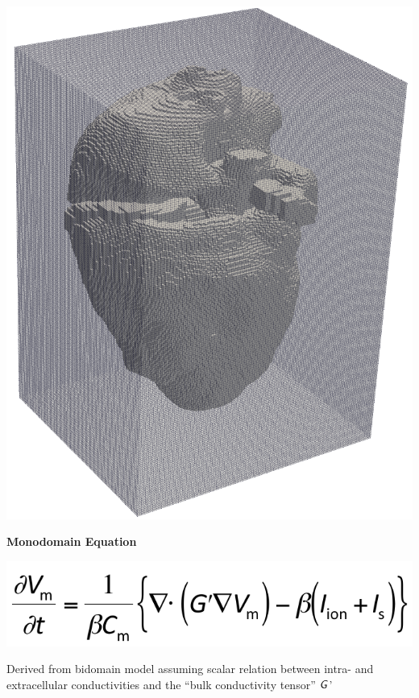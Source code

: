 \documentclass[12pt]{ICSPoster}
\begin{document}
\begin{posterbox}[2]
\begin{headerbox}[
        title=Modeling Aspects,
        width=0.47\textwidth,
        height=0.215\textheight]
      \begin{minipage}{0.35\textwidth}\sf
        \includegraphics[width=\textwidth]{pic_heart_box.png}
      \end{minipage}
      \begin{minipage}{0.50\textwidth}\sf
        \textbf{Monodomain Equation}
        \begin{center}
          \includegraphics[scale=0.55]{Monodomain}
        \end  {center}
        \vspace{-0.25cm}
        \begin{compactitem}
          \item Derived from bidomain model assuming scalar relation between intra- and extracellular
                conductivities and the ``bulk conductivity tensor'' $\text{\textsf{\textit{G}}}$'
        \end{compactitem}


\end{minipage}
\end{headerbox}
\end{posterbox}
\end{document}
